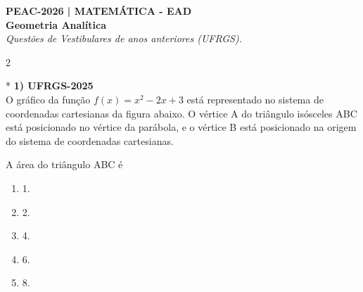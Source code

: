 \documentclass[11pt,a4paper]{article}
\begin{document}
\begin{center}
    \textbf{\Large PEAC-2026 | MATEMÁTICA - EAD} \\[0.2cm]
    \textbf{\large Geometria Analítica} \\[0.2cm]
    \textit{Questões de Vestibulares de anos anteriores (UFRGS).}
\end{center}
\vspace{0.5cm}

\begin{paracol}{2}


    \switchcolumn[0]*
    \textbf{1) UFRGS-2025} \\
    O gráfico da função $f(x) = x^2 - 2x + 3$ está representado no sistema de coordenadas cartesianas da figura abaixo. O vértice A do triângulo isósceles ABC está posicionado no vértice da parábola, e o vértice B está posicionado na origem do sistema de coordenadas cartesianas.

    \vspace{0.3cm}
    \begin{center}
    \end{center}
    \vspace{0.3cm}

    A área do triângulo ABC é

    \begin{enumerate}[label=(\Alph*), itemsep=0.2cm]
        \item 1.
        \item 2.
        \item 4.
        \item 6.
        \item 8.
    \end{enumerate}
    \vspace{0.4cm}


\end{paracol}
\end{document}
